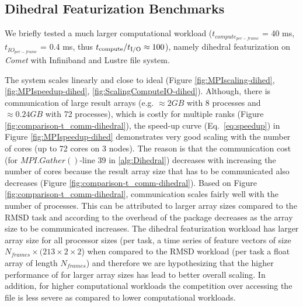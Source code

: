 \subsection{Dihedral Featurization Benchmarks}
\label{DF}
We briefly tested a much larger computational workload ($t_{compute_{per-frame}}$ = 40 ms, $t_{IO_{per-frame}}$ = 0.4 ms, thus ${t}_{\text{compute}}/{t}_{\text{I/O}} \approx 100$), namely dihedral
featurization on \emph{Comet} with Infiniband and Lustre file system.

The system scales linearly and close to ideal (Figure \ref{fig:MPIscaling-dihed}, \ref{fig:MPIspeedup-dihed}, \ref{fig:ScalingComputeIO-dihed}). Although, there is communication of large
result arrays (e.g. $\approx 2GB$ with 8 processes and $\approx 0.24GB$ with 72 processes), which is costly for multiple ranks (Figure \ref{fig:comparison-t_comm-dihedral}), the speed-up curve (Eq.~\ref{eq:speedup}) in Figure \ref{fig:MPIspeedup-dihed}
demonstrates very good scaling with the number of cores (up to 72 cores on 3 nodes).  The reason is that the communication cost (for
$MPI.Gather()$-line 39 in \ref{alg:Dihedral}) decreases with increasing the number of cores because the result array size that has to be
communicated also decreases (Figure \ref{fig:comparison-t_comm-dihedral}).  Based on Figure \ref{fig:comparison-t_comm-dihedral}, communication scales fairly well
with the number of processes. This can be attributed to larger array sizes compared to the RMSD task and according to \cite{Dalcin:2011aa}
the overhead of the  package decreases as the array size to be communicated increases. The dihedral featurization workload
has larger array size for all processor sizes (per task, a time series of feature vectors of size $N_{frames} \times (213 \times 2 \times 2$) when
compared to the RMSD workload (per task a float array of length $N_{frames}$) and therefore we are hypothesizing that the higher
performance of  for larger array sizes has lead to better overall scaling. 
In addition, for higher computational workloads the competition over accessing the file is less severe as compared to lower computational workloads. 
 
